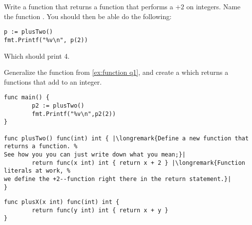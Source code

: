 \begin{Exercise}[title={Functions that return functions},difficulty=4]
\label{ex:function}
\Question\label{ex:function q1} Write a function that returns a function
that performs a $+2$ on integers. Name the function .
You should then be able do the following:
\begin{lstlisting}
p := plusTwo()
fmt.Printf("%v\n", p(2))
\end{lstlisting}
Which should print 4.

\Question\label{ex:function q2} Generalize the function from \ref{ex:function q1},
and create a  which returns a functions that add  to an
integer.
\end{Exercise}

\begin{Answer}
\Question
\begin{lstlisting}
func main() {
        p2 := plusTwo()
        fmt.Printf("%v\n",p2(2))
}

func plusTwo() func(int) int { |\longremark{Define a new function that returns a function. %
See how you you can just write down what you mean;}|
        return func(x int) int { return x + 2 } |\longremark{Function literals at work, %
we define the +2--function right there in the return statement.}|
}
\end{lstlisting}
\showremarks

\Question
\begin{lstlisting}
func plusX(x int) func(int) int {
        return func(y int) int { return x + y } 
}
\end{lstlisting}
\end{Answer}
